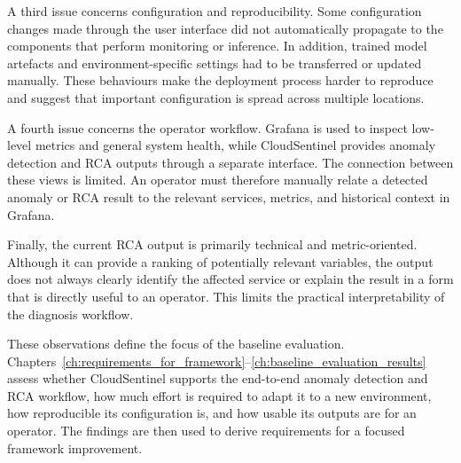 A third issue concerns configuration and reproducibility. Some configuration changes made through the user interface did not automatically propagate to the components that perform monitoring or inference. In addition, trained model artefacts and environment-specific settings had to be transferred or updated manually. These behaviours make the deployment process harder to reproduce and suggest that important configuration is spread across multiple locations.

A fourth issue concerns the operator workflow. Grafana is used to inspect low-level metrics and general system health, while CloudSentinel provides anomaly detection and RCA outputs through a separate interface. The connection between these views is limited. An operator must therefore manually relate a detected anomaly or RCA result to the relevant services, metrics, and historical context in Grafana.

Finally, the current RCA output is primarily technical and metric-oriented. Although it can provide a ranking of potentially relevant variables, the output does not always clearly identify the affected service or explain the result in a form that is directly useful to an operator. This limits the practical interpretability of the diagnosis workflow.

These observations define the focus of the baseline evaluation. Chapters~\ref{ch:requirements_for_framework}--\ref{ch:baseline_evaluation_results} assess whether CloudSentinel supports the end-to-end anomaly detection and RCA workflow, how much effort is required to adapt it to a new environment, how reproducible its configuration is, and how usable its outputs are for an operator. The findings are then used to derive requirements for a focused framework improvement.